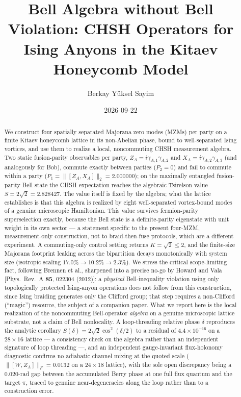 \documentclass[aps,pra,twocolumn,superscriptaddress,floatfix,nofootinbib]{revtex4-2}
\begin{document}
\setcounter{secnumdepth}{3}

\title{Bell Algebra without Bell Violation: CHSH Operators for Ising Anyons in the Kitaev Honeycomb Model}

\author{Berkay Y\"uksel Sayim}

\date{2026-09-22}

\begin{abstract}
We construct four spatially separated Majorana zero modes (MZMs) per
party on a finite Kitaev honeycomb lattice in its non-Abelian phase,
bound to well-separated Ising vortices, and use them to realize a
local, noncommuting CHSH measurement algebra. Two static fusion-parity
observables per party, $Z_A=i\gamma_{A,1}\gamma_{A,2}$ and
$X_A=i\gamma_{A,2}\gamma_{A,3}$ (and analogously for Bob), commute
exactly between parties ($P_2=0$) and fail to commute within a party
($P_1=\lVert[Z_A,X_A]\rVert_2=2.000000$); on the maximally entangled
fusion-parity Bell state the CHSH expectation reaches the algebraic
Tsirelson value $S=2\sqrt2=2.828427$. The value itself is fixed by the
algebra; what the lattice establishes is that this algebra is realized
by eight well-separated vortex-bound modes of a genuine microscopic
Hamiltonian. This value survives fermion-parity
superselection exactly, because the Bell state is a definite-parity
eigenstate with unit weight in its own sector --- a statement specific
to the present four-MZM, measurement-only construction, not to
braid-then-fuse protocols, which are a different experiment. A
commuting-only control
setting returns $K=\sqrt2\le2$, and the finite-size Majorana footprint
leaking across the bipartition decays monotonically with system size
(isotropic scaling $17.0\%\to10.2\%\to2.3\%$). We stress the critical
scope-limiting fact, following Brennen et al., sharpened into a precise no-go by Howard and
Vala [Phys.\ Rev.\ A \textbf{85}, 022304 (2012)]: a \emph{physical} Bell-inequality violation
using only topologically protected Ising-anyon operations does not
follow from this construction, since Ising braiding generates only the
Clifford group; that step requires a non-Clifford (``magic'') resource,
the subject of a companion paper. What we report here is the local
realization of the noncommuting Bell-operator \emph{algebra} on a
genuine microscopic lattice substrate, not a claim of Bell nonlocality.
A loop-threading relative phase $\delta$ reproduces the analytic
corollary $S(\delta)=2\sqrt2\cos^2(\delta/2)$ to a residual of
$4.4\times10^{-16}$ on a $28\times16$ lattice --- a consistency check on
the algebra rather than
an independent signature of loop threading ---, and an independent
gauge-invariant flux-holonomy
diagnostic confirms no adiabatic channel mixing at the quoted scale
($\lVert[W,Z_A]\rVert_F=0.0132$ on a $24\times18$ lattice), with the
sole open discrepancy being a
$0.020$-rad gap between the accumulated Berry phase at one full flux
quantum and the target $\pi$, traced to genuine near-degeneracies along
the loop rather than to a construction error.
\end{abstract}
\end{document}
